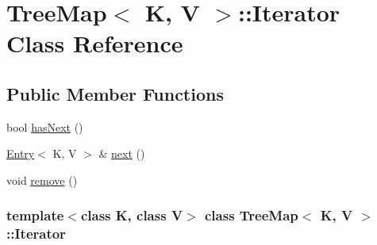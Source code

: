 \hypertarget{class_tree_map_1_1_iterator}{
\section{TreeMap$<$ K, V $>$::Iterator Class Reference}
\label{class_tree_map_1_1_iterator}
}
\subsection*{Public Member Functions}
\begin{DoxyCompactItemize}
\item 
bool \hyperlink{class_tree_map_1_1_iterator_a7ef8420006629ecfd31ba122dc7f3f79}{hasNext} ()
\item 
\hyperlink{class_entry}{Entry}$<$ K, V $>$ \& \hyperlink{class_tree_map_1_1_iterator_a3230003446ec0c1267b432c56e30be62}{next} ()
\item 
void \hyperlink{class_tree_map_1_1_iterator_ac5fd1faaf8822f80d224c677b0423d49}{remove} ()
\end{DoxyCompactItemize}
\subsubsection*{template$<$class K, class V$>$ class TreeMap$<$ K, V $>$::Iterator}



